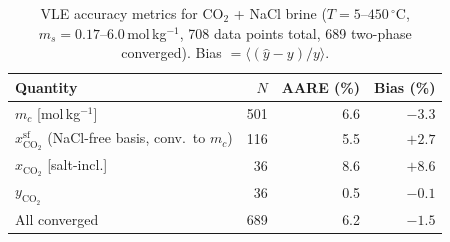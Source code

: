 \documentclass[preprint,12pt,authoryear]{elsarticle}
\begin{document}
\begin{table}[H]
  \centering
  \caption{VLE accuracy metrics for CO$_2$ + NaCl brine ($T = 5$--$450\,^\circ$C,
           $m_s = 0.17$--$6.0$\,mol\,kg$^{-1}$, 708 data points total,
           689 two-phase converged). Bias $= \langle(\hat{y} - y)/y\rangle$.}
  \label{tab:co2nacl_metrics}
  \begin{tabular}{lrrr}
    \toprule
    Quantity & $N$ & AARE (\%) & Bias (\%) \\
    \midrule
    $m_c$ [mol\,kg$^{-1}$]            & 501 & 6.6 & $-3.3$ \\
    $x_{\text{CO}_2}^{\text{sf}}$ (NaCl-free basis, conv.\ to $m_c$) & 116 & 5.5 & $+2.7$ \\
    $x_{\text{CO}_2}$ [salt-incl.]    &  36 & 8.6 & $+8.6$ \\
    $y_{\text{CO}_2}$                 &  36 & 0.5 & $-0.1$ \\
    \midrule
    All converged           & 689 & 6.2 & $-1.5$ \\
    \bottomrule
  \end{tabular}
\end{table}
\end{document}
